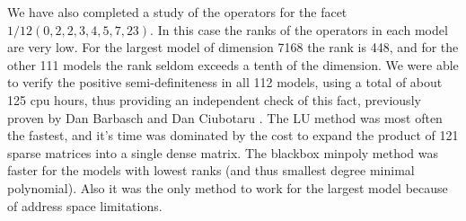 We have also completed a study of the operators for the facet
$1/12 (0,2,2,3,4,5,7,23)$.  In this case the ranks of the operators in
each model are very low.
For the largest model of dimension 7168 the rank is 448, and for the 
other 111 models the rank seldom exceeds a tenth of the dimension.
We were able to verify the positive semi-definiteness in all 112 models,
using a total of about 125 cpu hours, thus providing an independent check
of this fact, previously proven by Dan Barbasch and Dan Ciubotaru \cite{?}.  
The LU method was most often the 
fastest, and it's time was dominated by the cost to expand the product
of 121 sparse matrices into a single dense matrix.  The blackbox minpoly method was faster for the models with lowest ranks (and thus smallest degree minimal polynomial).  Also it was the only method to work for the largest model because of address space limitations.
